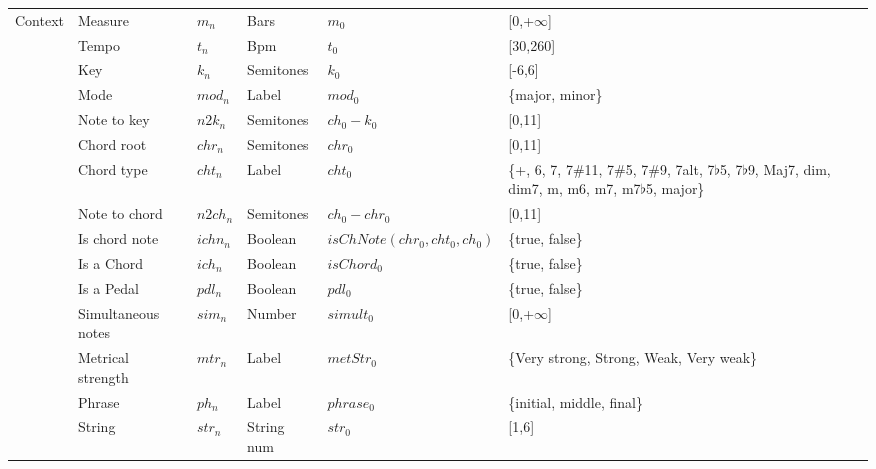 \begin{table}
{\begin{tabular}{ l l l l l p{2.5cm} }
    Context & Measure & $m_n$ & Bars & $m_0$ & [0,+$\infty$] \\
    & Tempo & $t_n$ & Bpm & $t_0$ & [30,260] \\
    & Key & $k_n$ & Semitones & $k_0$ & [-6,6] \\
 	& Mode & $mod_n$ & Label & $mod_0$ & \{major, minor\} \\
  	& Note to key & $n2k_n$ & Semitones & $ch_0-k_0$ & [0,11] \\
 	& Chord root & $chr_n$ & Semitones & $chr_0$ & [0,11] \\
    & Chord type & $cht_n$ & Label & $cht_0$  & \{+, 6, 7, 7\#11, 7\#5, 7\#9, 7alt, 7$\flat$5, 7$\flat$9, Maj7, dim, dim7, m, m6, m7, m7$\flat$5, major\} \\
	& Note to chord & $n2ch_n$ & Semitones & $ch_0-chr_0$ & [0,11] \\
 	& Is chord note & $ichn_n$ & Boolean & $isChNote(chr_0,cht_0,ch_0)$ & \{true, false\} \\
    & Is a Chord & $ich_n$ & Boolean & $isChord_0$ & \{true, false\} \\
    & Is a Pedal & $pdl_n$ & Boolean & $pdl_0$ & \{true, false\} \\
    & Simultaneous notes & $sim_n$ & Number & $simult_0$ & [0,+$\infty$] \\
 	& Metrical strength & $mtr_n$ & Label & $metStr_0$ & \{Very strong, Strong, Weak, Very weak\} \\
 	& Phrase & $ph_n$ & Label & $phrase_0$ & \{initial, middle, final\} \\
    & String & $str_n$ & String num & $str_0$ & [1,6] \\

    \hline

  \end{tabular}
  }
\end{table}
